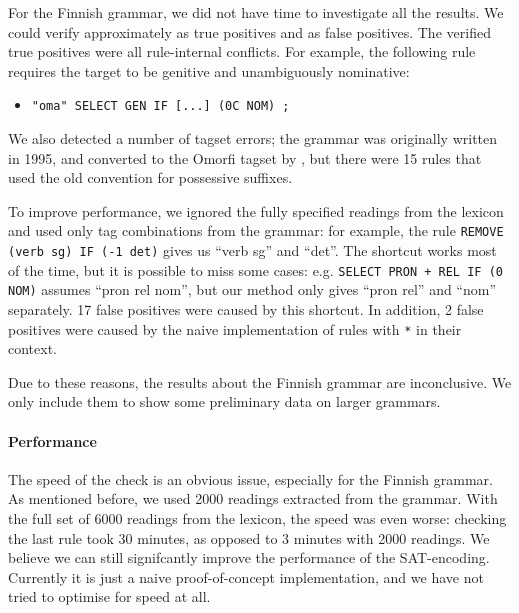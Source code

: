For the Finnish grammar, we did not have time to investigate all the
results. We could verify approximately  as true positives and
 as false positives.
The verified true positives were all rule-internal conflicts. 
For example, the following rule requires the target to be genitive and unambiguously nominative: 
\begin{itemize}
\item[]\texttt{"oma" SELECT GEN IF [...] (0C NOM) ;}
\end{itemize}
We also detected a number of tagset errors;
the grammar was originally written in 1995, and converted to the
Omorfi tagset by \cite{pirinen2015}, but there were 15 rules that used the old convention for possessive suffixes.

To improve performance, we ignored the fully specified readings from the
lexicon and used only tag combinations from the grammar:
for example, the rule \texttt{REMOVE (verb sg) IF (-1 det)}
gives us ``verb sg'' and ``det''.
The shortcut works most of the time, but it is possible to
miss some cases: e.g. \texttt{SELECT PRON + REL IF (0 NOM)} 
assumes ``pron rel nom'', but our method only gives
``pron rel'' and ``nom'' separately. 
17 false positives were caused by this shortcut. 
In addition, 2 false positives were caused by the naive implementation of
rules with \verb!*! in their context.

Due to these reasons, the results about the Finnish grammar are
inconclusive. We only include them to show some preliminary data on larger grammars.

\paragraph{Performance} The speed of the check is an obvious issue,
especially for the Finnish grammar. 
As mentioned before, we used 2000 readings extracted from the grammar.
With the full set of 6000 readings from the lexicon, the speed
was even worse: checking the last rule took 30 minutes, as opposed to
3 minutes with 2000 readings. 
We believe we can still signifcantly improve the performance of the SAT-encoding. Currently it is just a naive proof-of-concept implementation, and we have not tried to optimise for speed at all.

